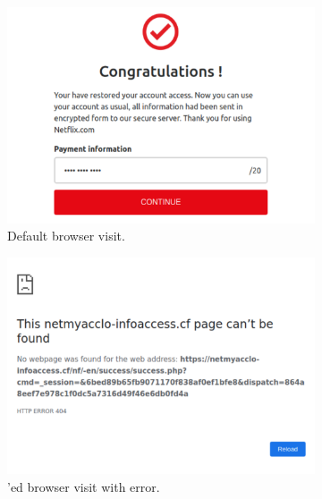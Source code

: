 \begin{figure}
\centering
	\begin{subfigure}[tb]{.31\textwidth}
		\includegraphics[width=\linewidth]{figs/netflix_n.pdf}
        \caption{Default browser visit.}
        \label{fig:normal}
	\end{subfigure}%
	\quad
	\begin{subfigure}[tb]{.31\textwidth}
		\includegraphics[width=\linewidth]{figs/netflix_sp.pdf}
        \caption{\spartacus'ed browser visit with error.}
        \label{fig:sp1}
	\end{subfigure}%
	\quad
	\begin{subfigure}[tb]{.31\textwidth}

\end{subfigure}
\end{figure}
